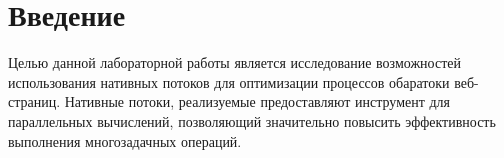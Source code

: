 \chapter*{Введение}

Целью данной лабораторной работы является исследование возможностей использования нативных потоков для оптимизации процессов обаратоки веб-страниц. Нативные потоки, реализуемые предоставляют инструмент для параллельных вычислений, позволяющий значительно повысить эффективность выполнения многозадачных операций.

